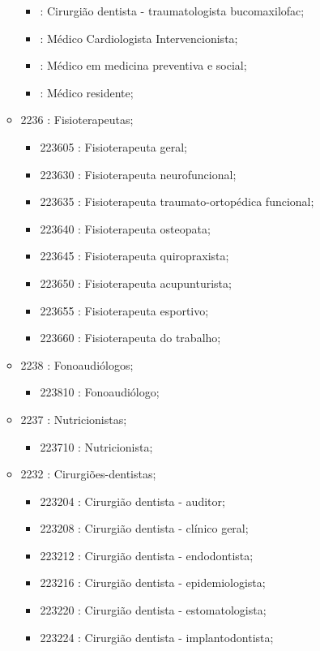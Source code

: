 \begin{itemize}
\begin{itemize}
\begin{itemize}
      \item  : Cirurgião dentista - traumatologista bucomaxilofac;
      \item  : Médico Cardiologista Intervencionista;
      \item  : Médico em medicina preventiva e social;
      \item  : Médico residente;
    \end{itemize}
    \item 2236 : Fisioterapeutas;
    \begin{itemize}
      \item 223605 : Fisioterapeuta geral;
      \item 223630 : Fisioterapeuta neurofuncional;
      \item 223635 : Fisioterapeuta traumato-ortopédica funcional;
      \item 223640 : Fisioterapeuta osteopata;
      \item 223645 : Fisioterapeuta quiropraxista;
      \item 223650 : Fisioterapeuta acupunturista;
      \item 223655 : Fisioterapeuta esportivo;
      \item 223660 : Fisioterapeuta do trabalho;
    \end{itemize}
    \item 2238 : Fonoaudiólogos;
    \begin{itemize}
      \item 223810 : Fonoaudiólogo;
    \end{itemize}
    \item 2237 : Nutricionistas;
    \begin{itemize}
      \item 223710 : Nutricionista;
    \end{itemize}
    \item 2232 : Cirurgiões-dentistas;
    \begin{itemize}
      \item 223204 : Cirurgião dentista - auditor;
      \item 223208 : Cirurgião dentista - clínico geral;
      \item 223212 : Cirurgião dentista - endodontista;
      \item 223216 : Cirurgião dentista - epidemiologista;
      \item 223220 : Cirurgião dentista - estomatologista;
      \item 223224 : Cirurgião dentista - implantodontista;

\end{itemize}
\end{itemize}
\end{itemize}
